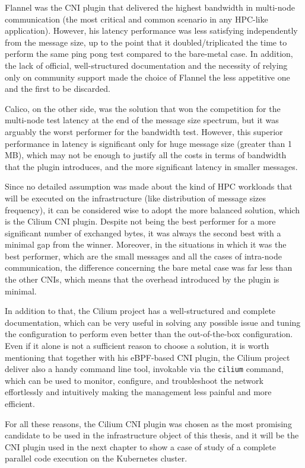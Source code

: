 Flannel was the CNI plugin that delivered the highest bandwidth in multi-node
communication (the most critical and common scenario in any HPC-like
application). However, his latency performance was less satisfying independently
from the message size, up to the point that it doubled/triplicated the time to
perform the same ping pong test compared to the bare-metal case.
In addition, the lack of official, well-structured documentation and the
necessity of relying only on community support made the choice of Flannel the
less appetitive one and the first to be discarded.

Calico, on the other side, was the solution that won the competition for the
multi-node test latency at the end of the message size spectrum, but it was
arguably the worst performer for the bandwidth test.
However, this superior performance in latency is significant only for huge
message size (greater than 1 MB), which may not be enough to justify all the
costs in terms of bandwidth that the plugin introduces, and the more significant
latency in smaller messages.

Since no detailed assumption was made about the kind of HPC workloads that will
be executed on the infrastructure (like distribution of message sizes
frequency), it can be considered wise to adopt the more balanced solution, which
is the Cilium CNI plugin.
Despite not being the best performer for a more significant number of exchanged
bytes, it was always the second best with a minimal gap from the winner.
Moreover, in the situations in which it was the best performer, which are the
small messages and all the cases of intra-node communication, the difference
concerning the bare metal case was far less than the other CNIs, which means
that the overhead introduced by the plugin is minimal.

In addition to that, the Cilium project has a well-structured and complete
documentation, which can be very useful in solving any possible issue and tuning
the configuration to perform even better than the out-of-the-box configuration.
Even if it alone is not a sufficient reason to choose a solution, it is worth
mentioning that together with his eBPF-based CNI plugin, the Cilium project
deliver also a handy command line tool, invokable via the \texttt{cilium}
command, which can be used to monitor, configure, and troubleshoot the network
effortlessly and intuitively making the management less painful and more
efficient.

For all these reasons, the Cilium CNI plugin was chosen as the most promising
candidate to be used in the infrastructure object of this thesis, and it will be
the CNI plugin used in the next chapter to show a case of study of a complete
parallel code execution on the Kubernetes cluster.

